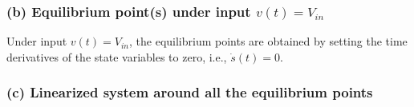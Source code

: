 \subsubsection*{(b) Equilibrium point(s) under input \(v(t)=V_{in}\)}

Under input \( v(t)=V_{in} \), the equilibrium points are obtained by setting the time derivatives of the state variables to zero, i.e., \( \dot s(t) = 0 \).

\subsubsection*{(c) Linearized system around all the equilibrium points}
